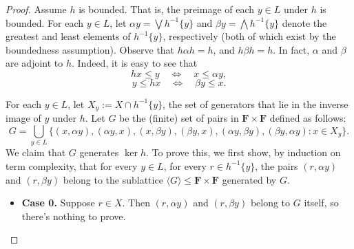 \begin{proof}
Assume $h$ is bounded.  That is, the preimage of each $y\in L$ under $h$ is bounded.  For each $y\in L$, let $\alpha y= \bigvee h^{-1}\{y\}$ and $\beta y = \bigwedge h^{-1}\{y\}$ denote the greatest and least elements of $h^{-1}\{y\}$, respectively (both of which exist by the boundedness assumption).  Observe that $h \alpha h = h$, and $h \beta h = h$. In fact, $\alpha$ and $\beta$ are adjoint to $h$. Indeed, it is easy to see that
\[
h x \leqslant y \quad \Leftrightarrow \quad x \leqslant \alpha y,
\]
\[
y \leqslant h x \quad \Leftrightarrow \quad \beta y \leqslant x.
\]

For each $y \in L$, let $X_y := X\cap h^{-1}\{y\}$, the set of generators that lie in the inverse image of $y$ under $h$.
Let $G$ be the (finite) set of pairs in $\mathbf F \times \mathbf F$ defined as follows:
\[
G = \bigcup_{y \in L}\{(x, \alpha y), (\alpha y, x), (x, \beta y), (\beta y, x), (\alpha y, \beta y), (\beta y, \alpha y) : x \in X_y\}.
\]
We claim that $G$ generates $\ker h$.  To prove this, we first show, by induction on term complexity, that for every $y \in L$, for every $r \in h^{-1}\{y\}$, the pairs $(r,\alpha y)$ and $(r,\beta y)$ belong to the sublattice $\langle G \rangle \leqslant \mathbf F \times \mathbf F$ generated by $G$.

\begin{itemize}
  \item {\bf Case 0.} Suppose $r \in X$. Then $(r,\alpha y)$ and $(r,\beta y)$ belong to $G$ itself, so there's nothing to prove.  


\end{itemize}
\end{proof}

